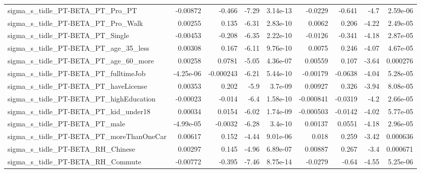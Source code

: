 \begin{tabular}{lrrrrrrrr}
sigma\_s\_tidle\_PT-BETA\_PT\_Pro\_PT                    &    -0.00872 &       -0.466 &    -7.29 & 3.14e-13 &    -0.0229 &      -0.641 &         -4.7 &      2.59e-06 \\
sigma\_s\_tidle\_PT-BETA\_PT\_Pro\_Walk                  &     0.00255 &        0.135 &    -6.31 & 2.83e-10 &     0.0062 &       0.206 &        -4.22 &      2.49e-05 \\
sigma\_s\_tidle\_PT-BETA\_PT\_Single                    &    -0.00453 &       -0.208 &    -6.35 & 2.22e-10 &    -0.0126 &      -0.341 &        -4.18 &      2.87e-05 \\
sigma\_s\_tidle\_PT-BETA\_PT\_age\_35\_less               &     0.00308 &        0.167 &    -6.11 & 9.76e-10 &     0.0075 &       0.246 &        -4.07 &      4.67e-05 \\
sigma\_s\_tidle\_PT-BETA\_PT\_age\_60\_more               &     0.00258 &       0.0781 &    -5.05 & 4.36e-07 &    0.00559 &       0.107 &        -3.64 &      0.000276 \\
sigma\_s\_tidle\_PT-BETA\_PT\_fulltimeJob               &   -4.25e-06 &    -0.000243 &    -6.21 & 5.44e-10 &   -0.00179 &     -0.0638 &        -4.04 &      5.28e-05 \\
sigma\_s\_tidle\_PT-BETA\_PT\_haveLicense               &     0.00353 &        0.202 &     -5.9 &  3.7e-09 &    0.00927 &       0.326 &        -3.94 &      8.08e-05 \\
sigma\_s\_tidle\_PT-BETA\_PT\_highEducation             &    -0.00023 &       -0.014 &     -6.4 & 1.58e-10 &  -0.000841 &     -0.0319 &         -4.2 &      2.66e-05 \\
sigma\_s\_tidle\_PT-BETA\_PT\_kid\_under18               &     0.00034 &       0.0154 &    -6.02 & 1.74e-09 &  -0.000503 &     -0.0142 &        -4.02 &      5.77e-05 \\
sigma\_s\_tidle\_PT-BETA\_PT\_male                      &   -4.99e-05 &      -0.0032 &    -6.28 &  3.4e-10 &    0.00137 &      0.0551 &        -4.18 &      2.96e-05 \\
sigma\_s\_tidle\_PT-BETA\_PT\_moreThanOneCar            &     0.00617 &        0.152 &    -4.44 & 9.01e-06 &      0.018 &       0.259 &        -3.42 &      0.000636 \\
sigma\_s\_tidle\_PT-BETA\_RH\_Chinese                   &     0.00297 &        0.145 &    -4.96 & 6.89e-07 &    0.00887 &       0.267 &         -3.4 &      0.000671 \\
sigma\_s\_tidle\_PT-BETA\_RH\_Commute                   &    -0.00772 &       -0.395 &    -7.46 & 8.75e-14 &    -0.0279 &       -0.64 &        -4.55 &      5.25e-06 \\

\end{tabular}
